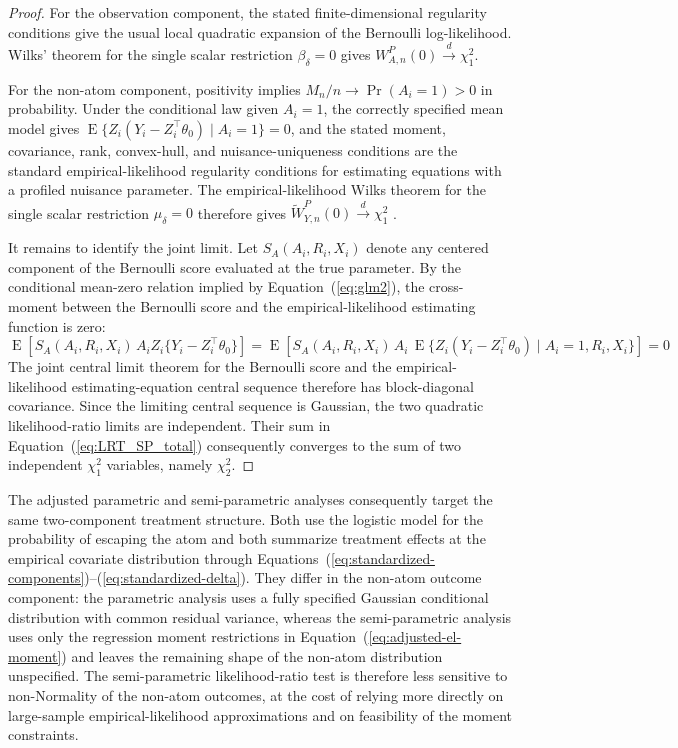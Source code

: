\documentclass[11pt]{article}
\DeclareMathOperator*{\E}{E}
\begin{document}
\begin{proof}
For the observation component, the stated finite-dimensional regularity conditions give the usual local quadratic expansion of the Bernoulli log-likelihood. Wilks' theorem for the single scalar restriction $\beta_\delta=0$ gives $W_{A,n}^P(0)\overset{d}{\to}\chi^2_1$.

For the non-atom component, positivity implies $M_n/n\to\Pr(A_i=1)>0$ in probability. Under the conditional law given $A_i=1$, the correctly specified mean model gives $\E\{Z_i(Y_i-Z_i^\top\theta_0)\mid A_i=1\}=0$, and the stated moment, covariance, rank, convex-hull, and nuisance-uniqueness conditions are the standard empirical-likelihood regularity conditions for estimating equations with a profiled nuisance parameter. The empirical-likelihood Wilks theorem for the single scalar restriction $\mu_\delta=0$ therefore gives $\widetilde{W}_{Y,n}^P(0)\overset{d}{\to}\chi^2_1$ \citep{owen1991empirical,qin1994empirical}.

It remains to identify the joint limit. Let $S_A(A_i,R_i,X_i)$ denote any centered component of the Bernoulli score evaluated at the true parameter. By the conditional mean-zero relation implied by Equation~(\ref{eq:glm2}), the cross-moment between the Bernoulli score and the empirical-likelihood estimating function is zero:
\[
  \E\!\left[
    S_A(A_i,R_i,X_i)\,
    A_i Z_i\{Y_i-Z_i^\top\theta_0\}
  \right]
  =
  \E\!\left[
    S_A(A_i,R_i,X_i)\,
    A_i\,\E\{Z_i(Y_i-Z_i^\top\theta_0)\mid A_i=1,R_i,X_i\}
  \right]
  =0
\]
The joint central limit theorem for the Bernoulli score and the empirical-likelihood estimating-equation central sequence therefore has block-diagonal covariance. Since the limiting central sequence is Gaussian, the two quadratic likelihood-ratio limits are independent. Their sum in Equation~(\ref{eq:LRT_SP_total}) consequently converges to the sum of two independent $\chi^2_1$ variables, namely $\chi^2_2$.
\end{proof}

The adjusted parametric and semi-parametric analyses consequently target the same two-component treatment structure. Both use the logistic model for the probability of escaping the atom and both summarize treatment effects at the empirical covariate distribution through Equations~(\ref{eq:standardized-components})--(\ref{eq:standardized-delta}). They differ in the non-atom outcome component: the parametric analysis uses a fully specified Gaussian conditional distribution with common residual variance, whereas the semi-parametric analysis uses only the regression moment restrictions in Equation~(\ref{eq:adjusted-el-moment}) and leaves the remaining shape of the non-atom distribution unspecified. The semi-parametric likelihood-ratio test is therefore less sensitive to non-Normality of the non-atom outcomes, at the cost of relying more directly on large-sample empirical-likelihood approximations and on feasibility of the moment constraints.
\end{document}
